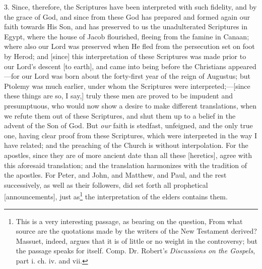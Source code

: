 3. Since, therefore, the Scriptures have been interpreted with such fidelity, and by the grace of God, and since from these God has prepared and formed again our faith towards His Son, and has preserved to us the unadulterated Scriptures in Egypt, where the house of Jacob flourished, fleeing from the famine in Canaan; where also our Lord was preserved when He fled from the persecution set on foot by Herod; and [since] this interpretation of these Scriptures was made prior to our Lord’s descent [to earth], and came into being before the Christians appeared —for our Lord was born about the forty-first year of the reign of Augustus; but Ptolemy was much earlier, under whom the Scriptures were interpreted;—[since these things are so, I say,] truly these men are proved to be impudent and presumptuous, who would now show a desire to make different translations, when we refute them out of these Scriptures, and shut them up to a belief in the advent of the Son of God. But \emph{our} faith is stedfast, unfeigned, and the only true one, having clear proof from these Scriptures, which were interpreted in the way I have related; and the preaching of the Church is without interpolation. For the apostles, since they are of more ancient date than all these [heretics], agree with this aforesaid translation; and the translation harmonizes with the tradition of the apostles. For Peter, and John, and Matthew, and Paul, and the rest successively, as well as their followers, did set forth all prophetical [announcements], just as\footnote{This is a very interesting passage, as bearing on the question, From what source are the quotations made by the writers of the New Testament derived? Massuet, indeed, argues that it is of little or no weight in the controversy; but the passage speaks for itself. Comp. Dr. Robert’s \emph{Discussions on the Gospels}, part i. ch. iv. and vii.} the interpretation of the elders contains them.

